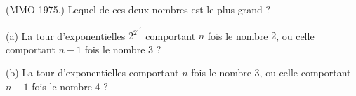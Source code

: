 (MMO 1975.) Lequel de ces deux nombres est le plus grand ?

(a) La tour d'exponentielles $2^{2^{\cdot^{\cdot^{\cdot^{2}}}}}$ comportant $n$ fois le nombre $2$, ou celle comportant $n - 1$ fois le nombre $3$ ?

(b) La tour d'exponentielles comportant $n$ fois le nombre $3$, ou celle comportant $n - 1$ fois le nombre $4$ ?

